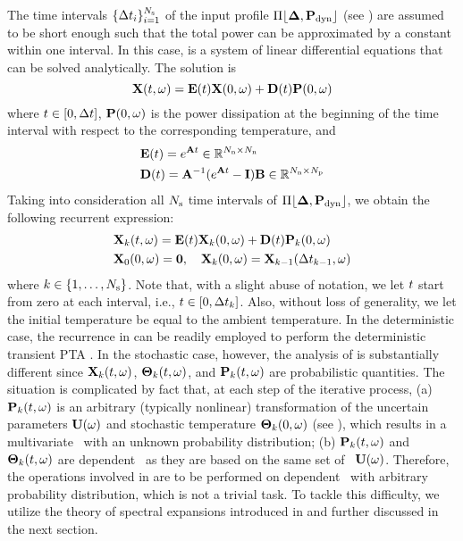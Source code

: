 The time intervals $\{ \Delta t_i \}_{i = 1}^{N_\text{s}}$ of the input profile $\profPdyn$ (see ) are assumed to be short enough such that the total power can be approximated by a constant within one interval. In this case,  is a system of linear differential equations that can be solved analytically. The solution is
\begin{equation} \elabel{ode-solution}
  \vX(\t, \o) = \mE(\t) \vX(0, \o) + \mD(\t) \vP(0, \o)
\end{equation}
where $t \in [0, \Delta t]$, $\mathbf{P}(0, \omega)$ is the power dissipation at the beginning of the time interval with respect to the corresponding temperature, and
\begin{align*}
  & \mE(\t) = e^{\mA \t} \in \real^{\nodes \times \nodes} \\
  & \mD(\t) = \mA^{-1} (e^{\mA \t} - \mI) \mB \in \real^{\nodes \times \cores}
\end{align*}
Taking into consideration all $N_\text{s}$ time intervals of $\profPdyn$, we obtain the following recurrent expression:
\begin{align}
  & \vX_k(\t, \o) = \mE(\t) \vX_k(0, \o) + \mD(\t) \vP_k(0, \o) \elabel{recurrence} \\
  & \vX_0(0, \o) = \vZero, \hspace{1em} \vX_k(0, \o) = \vX_{k - 1}(\dt_{k - 1}, \o) \nonumber
\end{align}
where $k \in \{ 1, \dotsc, N_\text{s} \}$. Note that, with a slight abuse of notation, we let $t$ start from zero at each interval, i.e., $t \in [ 0, \Delta t_k ]$. Also, without loss of generality, we let the initial temperature be equal to the ambient temperature. In the deterministic case, the recurrence in  can be readily employed to perform the deterministic transient PTA \cite{thiele2011, ukhov2012}. In the stochastic case, however, the analysis of  is substantially different since $\mathbf{X}_k(t, \omega)$, ${\boldsymbol\Theta}_k(t, \omega)$, and $\mathbf{P}_k(t, \omega)$ are probabilistic quantities. The situation is complicated by fact that, at each step of the iterative process, (a) $\mathbf{P}_k(t, \omega)$ is an arbitrary (typically nonlinear) transformation of the uncertain parameters $\mathbf{U}(\omega)$ and stochastic temperature ${\boldsymbol\Theta}_k(0, \omega)$ (see ), which results in a multivariate \rv\ with an unknown probability distribution; (b) $\mathbf{P}_k(t, \omega)$ and ${\boldsymbol\Theta}_k(t, \omega)$ are dependent \rvs\ as they are based on the same set of \rvs\ $\mathbf{U}(\omega)$. Therefore, the operations involved in  are to be performed on dependent \rvs\ with arbitrary probability distribution, which is not a trivial task. To tackle this difficulty, we utilize the theory of spectral expansions introduced in  and further discussed in the next section.
